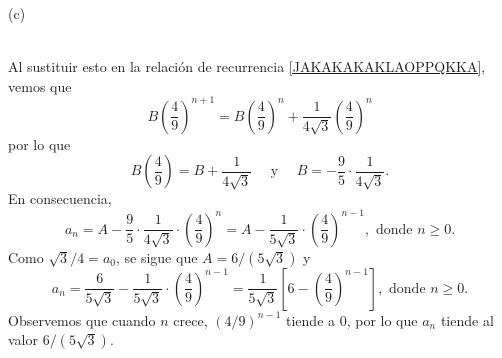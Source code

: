 \begin{myexample}
\begin{minipage}[c]{0.25\textwidth}
\begin{center}
            (c)

            \label{fig:KOCH}
        \end{center}
    \end{minipage}\\[-0.1cm]
    
    Al sustituir esto en la relación de recurrencia \eqref{JAKAKAKAKLAOPPQKKA}, vemos que
    $$B \left(\frac{4}{9}\right)^{n+1} = B \left(\frac{4}{9}\right)^n + \frac{1}{4 \sqrt{3}} \left(\frac{4}{9}\right)^n$$
    por lo que
    $$B\left(\frac{4}{9}\right) = B + \frac{1}{4 \sqrt{3}} \quad \text{ y } \quad B = -\frac{9}{5} \cdot \frac{1}{4 \sqrt{3}}.$$
    En consecuencia,
    $$a_n = A - \frac{9}{5} \cdot \frac{1}{4 \sqrt{3}} \cdot \left(\frac{4}{9}\right)^n = A - \frac{1}{5 \sqrt{3}} \cdot \left(\frac{4}{9}\right)^{n-1}, \text{ donde } n \geq 0.$$
    Como $\sqrt{3} / 4 = a_0$, se sigue que $A = 6 /(5 \sqrt{3})$
    y
    $$a_n = \frac{6}{5 \sqrt{3}} - \frac{1}{5 \sqrt{3}} \cdot \left(\frac{4}{9}\right)^{n-1} = \frac{1}{5 \sqrt{3}} \left[6 - \left(\frac{4}{9}\right)^{n-1}\right], \text{ donde } n \geq 0.$$
    Observemos que cuando $n$ crece, $(4/9)^{n-1}$ tiende a 0, por lo que $a_n$ tiende al valor $6 /(5 \sqrt{3})$.
\end{myexample}